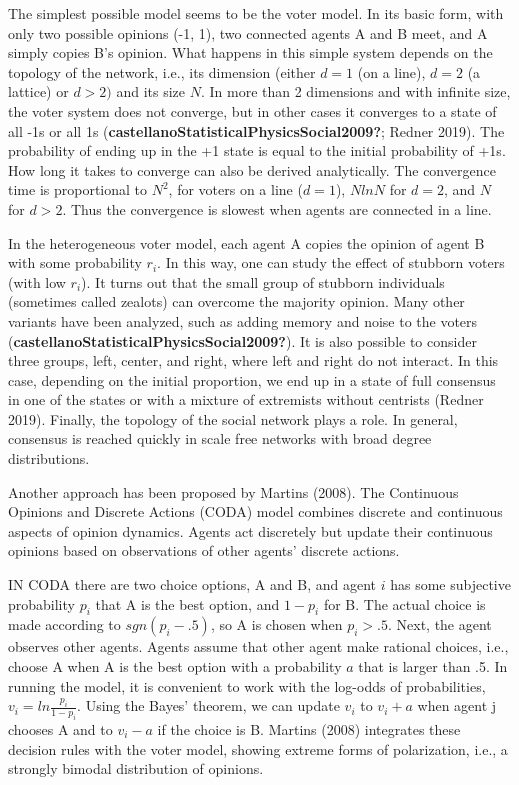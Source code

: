 \documentclass[
  a4paper,
  DIV=11,
  numbers=noendperiod]{scrreprt}
\begin{document}
The simplest possible model seems to be the voter model. In its basic
form, with only two possible opinions (-1, 1), two connected agents A
and B meet, and A simply copies B's opinion. What happens in this simple
system depends on the topology of the network, i.e., its dimension
(either \(d = 1\) (on a line), \(d = 2\) (a lattice) or \(d > 2)\) and
its size \(N\). In more than 2 dimensions and with infinite size, the
voter system does not converge, but in other cases it converges to a
state of all -1s or all 1s
(\textbf{castellanoStatisticalPhysicsSocial2009?}; Redner 2019). The
probability of ending up in the +1 state is equal to the initial
probability of +1s. How long it takes to converge can also be derived
analytically. The convergence time is proportional to \(N^{2}\), for
voters on a line (\(d = 1\)), \(NlnN\) for \(d = 2\), and \(N\) for
\(d > 2\). Thus the convergence is slowest when agents are connected in
a line.

In the heterogeneous voter model, each agent A copies the opinion of
agent B with some probability \(r_{i}\). In this way, one can study the
effect of stubborn voters (with low \(r_{i}\)). It turns out that the
small group of stubborn individuals (sometimes called zealots) can
overcome the majority opinion. Many other variants have been analyzed,
such as adding memory and noise to the voters
(\textbf{castellanoStatisticalPhysicsSocial2009?}). It is also possible
to consider three groups, left, center, and right, where left and right
do not interact. In this case, depending on the initial proportion, we
end up in a state of full consensus in one of the states or with a
mixture of extremists without centrists (Redner 2019). Finally, the
topology of the social network plays a role. In general, consensus is
reached quickly in scale free networks with broad degree distributions.

Another approach has been proposed by Martins (2008). The Continuous
Opinions and Discrete Actions (CODA) model combines discrete and
continuous aspects of opinion dynamics. Agents act discretely but update
their continuous opinions based on observations of other agents'
discrete actions.

IN CODA there are two choice options, A and B, and agent \(i\) has some
subjective probability \(p_{i}\) that A is the best option, and
\({1 - p}_{i}\) for B. The actual choice is made according to
\(sgn\left( p_{i} - .5 \right)\), so A is chosen when \(p_{i} > .5\).
Next, the agent observes other agents. Agents assume that other agent
make rational choices, i.e., choose A when A is the best option with a
probability \(a\) that is larger than .5. In running the model, it is
convenient to work with the log-odds of probabilities,
\(v_{i} = ln\frac{p_{i}}{1 - p_{i}}\). Using the Bayes' theorem, we can
update \(v_{i}\) to \(v_{i} + a\) when agent j chooses A and to
\(v_{i} - a\) if the choice is B. Martins (2008) integrates these
decision rules with the voter model, showing extreme forms of
polarization, i.e., a strongly bimodal distribution of opinions.
\end{document}

